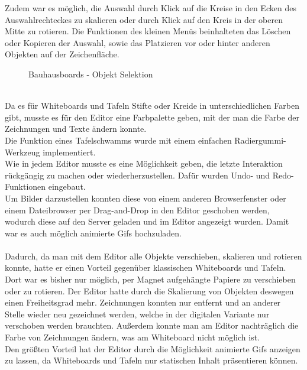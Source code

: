 Zudem war es möglich, die Auswahl durch Klick auf die Kreise in den Ecken des Auswahlrechteckes zu skalieren oder durch Klick auf den Kreis in der oberen Mitte zu rotieren.
Die Funktionen des kleinen Menüs beinhalteten das Löschen oder Kopieren der Auswahl, sowie das Platzieren vor oder hinter anderen Objekten auf der Zeichenfläche.
\begin{figure}
  \centering
  \caption{Bauhausboards - Objekt Selektion}
  \label{img:editorObjectSelection}
\end{figure}
\\
Da es für Whiteboards und Tafeln Stifte oder Kreide in unterschiedlichen Farben gibt, musste es für den Editor eine Farbpalette geben, mit der man die Farbe der Zeichnungen und Texte ändern konnte.
\\
Die Funktion eines Tafelschwamms wurde mit einem einfachen Radiergummi-Werkzeug implementiert.
\\
Wie in jedem Editor musste es eine Möglichkeit geben, die letzte Interaktion rückgängig zu machen oder wiederherzustellen. Dafür wurden Undo- und Redo-Funktionen eingebaut.
\\
Um Bilder darzustellen konnten diese von einem anderen Browserfenster oder einem Dateibrowser per Drag-and-Drop in den Editor geschoben werden, wodurch diese auf den Server geladen und im Editor angezeigt wurden.
Damit war es auch möglich animierte Gifs hochzuladen.
\\
\\
Dadurch, da man mit dem Editor alle Objekte verschieben, skalieren und rotieren konnte, hatte er einen Vorteil gegenüber klassischen Whiteboards und Tafeln.
Dort war es bisher nur möglich, per Magnet aufgehängte Papiere zu verschieben oder zu rotieren.
Der Editor hatte durch die Skalierung von Objekten deswegen einen Freiheitsgrad mehr.
Zeichnungen konnten nur entfernt und an anderer Stelle wieder neu gezeichnet werden, welche in der digitalen Variante nur verschoben werden brauchten. Außerdem konnte man am Editor nachträglich die Farbe von Zeichnungen ändern, was am Whiteboard nicht möglich ist.
\\
Den größten Vorteil hat der Editor durch die Möglichkeit animierte Gifs anzeigen zu lassen, da Whiteboards und Tafeln nur statischen Inhalt präsentieren können.





